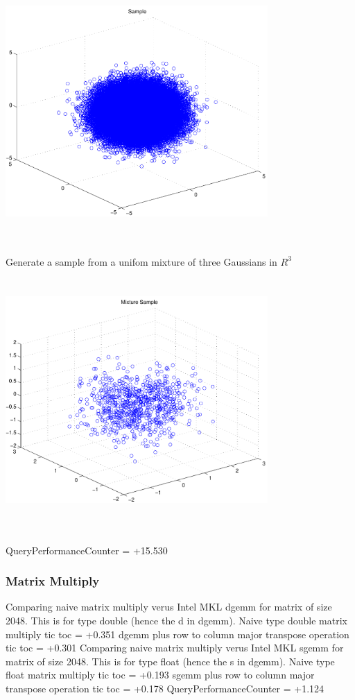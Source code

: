 \documentclass[9pt]{article}
\theoremstyle{plain}
\theoremstyle{definition}
\theoremstyle{remark}
\numberwithin{equation}{section}
\begin{document}
\includegraphics[width=10.0cm,height=10.0cm]{R_3_Normal.pdf}

Generate a sample from a unifom mixture of three Gaussians in $R^3$
\includegraphics[width=10.0cm,height=10.0cm]{R_3_Normal_Mixture.pdf}

QueryPerformanceCounter  =  +15.530
\subsubsection{Matrix Multiply}
Comparing naive matrix multiply verus Intel MKL dgemm for matrix of size 2048.
This is for type double (hence the d in dgemm).
Naive type double matrix multiply tic toc  =  +0.351
dgemm plus row to column major transpose operation tic toc  =  +0.301
Comparing naive matrix multiply verus Intel MKL sgemm for matrix of size 2048.
This is for type float (hence the s in dgemm).
Naive type float matrix multiply tic toc  =  +0.193
sgemm plus row to column major transpose operation tic toc  =  +0.178
QueryPerformanceCounter  =  +1.124
\end{document}
